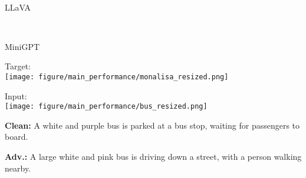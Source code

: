\begin{figure*}[t]
    \vspace{-5pt}
    \begin{minipage}{0.15\linewidth}
        ~
    \end{minipage}
    \begin{minipage}{0.34\linewidth}
        \centering
        \small LLaVA
    \end{minipage}
    \begin{minipage}{0.15\linewidth}
        ~
    \end{minipage}
    \begin{minipage}{0.34\linewidth}
        \centering
        \small MiniGPT
    \end{minipage}
    \newline
    \begin{minipage}{0.15\linewidth}
        \begin{minipage}{\linewidth}
        \parbox{\linewidth}{\centering \small Target: \\ \texttt{[image: figure/main\_performance/monalisa\_resized.png]}}
        \end{minipage}
        \newline
        \begin{minipage}{\linewidth}
        \parbox{\linewidth}{\centering \small Input: \\ \texttt{[image: figure/main\_performance/bus\_resized.png]}}
        \end{minipage}
    \end{minipage}
    \begin{minipage}{0.34\linewidth}
        \begin{tcolorbox}[colback=green!30, sharp corners, boxrule=0pt, left=0pt, right=0pt, top=0pt, bottom=0pt, width=\linewidth]
            \small \textbf{Clean:} A white and purple bus is parked at a bus stop, waiting for passengers to board.
        \end{tcolorbox}
        \vspace{-11px}
        \begin{tcolorbox}[colback=green!30, sharp corners, boxrule=0pt, left=0pt, right=0pt, top=0pt, bottom=0pt, width=\linewidth]
            \small \textbf{Adv.:} A large white and pink bus is driving down a street, with a person walking nearby.
        \end{tcolorbox}
        \vspace{-11px}
        \begin{tcolorbox}[colback=yellow!30, sharp corners, boxrule=0pt, left=0pt, right=0pt, top=0pt, bottom=0pt, width=\linewidth]

\end{tcolorbox}
\end{minipage}
\end{figure*}

